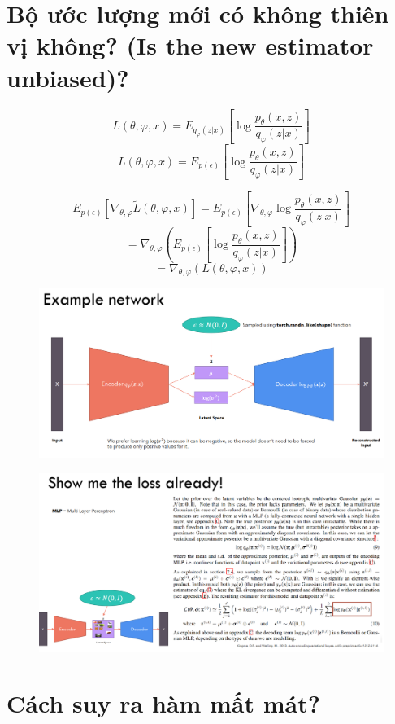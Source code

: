 \documentclass{book}
\begin{document}
\section{Bộ ước lượng mới có không thiên vị không? (Is the new estimator unbiased)?}
\begin{flushleft}
$$ L(\theta, \varphi, x) = E_{q_\varphi(z|x)} \left[ \log \frac{p_\theta(x,z)}{q_\varphi(z|x)} \right] $$
$$ L(\theta, \varphi, x) = E_{p(\epsilon)} \left[ \log \frac{p_\theta(x,z)}{q_\varphi(z|x)} \right] $$

$$ E_{p(\epsilon)} \left[ \nabla_{\theta,\varphi} \tilde{L}(\theta, \varphi, x) \right] = E_{p(\epsilon)} \left[ \nabla_{\theta,\varphi} \log \frac{p_\theta(x,z)}{q_\varphi(z|x)} \right] $$
$$ = \nabla_{\theta,\varphi} \left( E_{p(\epsilon)} \left[ \log \frac{p_\theta(x,z)}{q_\varphi(z|x)} \right] \right) $$
$$ = \nabla_{\theta,\varphi} (L(\theta, \varphi, x)) $$
\end{flushleft}

\begin{figure}[H]
    \centering
    \includegraphics[width=0.75\linewidth]{images/VAE_13.png}
\end{figure}

\begin{figure}[H]
    \centering
    \includegraphics[width=0.75\linewidth]{images/VAE_14.png}
\end{figure}

\section{Cách suy ra hàm mất mát?}
\end{document}
